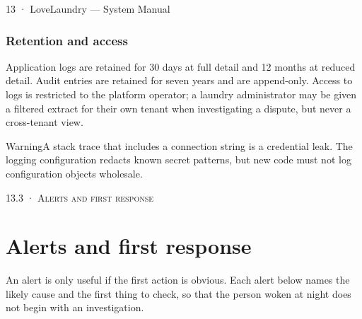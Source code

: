 \documentclass[11pt,a4paper,oneside]{book}
\begin{document}
13 · LoveLaundry — System Manual

\subsubsection*{Retention and access}
Application logs are retained for 30 days at full detail and 12 months at reduced detail. Audit entries are retained for seven years and are append-only. Access to logs is restricted to the platform operator; a laundry administrator may be given a filtered extract for their own tenant when investigating a dispute, but never a cross-tenant view.

\begin{notebox}WarningA stack trace that includes a connection string is a credential leak. The logging configuration redacts known secret patterns, but new code must not log configuration objects wholesale.\end{notebox}
\textsc{\small\color{crimson}13.3 · Alerts and first response}\par\medskip
\section*{Alerts and first response}
An alert is only useful if the first action is obvious. Each alert below names the likely cause and the first thing to check, so that the person woken at night does not begin with an investigation.
\end{document}
